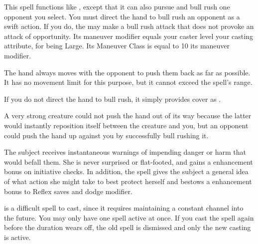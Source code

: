 \begin{spelleffect}
  This spell functions like , except that it can also pursue and bull rush one opponent you select. You must direct the hand to bull rush an opponent as a swift action. If you do, the  may make a bull rush attack that does not provoke an attack of opportunity. Its maneuver modifier equals your caster level \add your casting attribute,  for being Large. Its Maneuver Class is equal to 10 \add its maneuver modifier.
  \par The hand always moves with the opponent to push them back as far as possible. It has no movement limit for this purpose, but it cannot exceed the spell's range.
  \par If you do not direct the hand to bull rush, it simply provides cover as .
\end{spelleffect}
\begin{spellnotes}
  A very strong creature could not push the hand out of its way because the latter would instantly reposition itself between the creature and you, but an opponent could push the hand up against you by successfully bull rushing it.
\end{spellnotes}

\begin{spelleffect}
  The subject receives instantaneous warnings of impending danger or harm that would befall them. She is never surprised or flat-footed, and gains a  enhancement bonus on initiative checks. In addition, the spell gives the subject a general idea of what action she might take to best protect herself and bestows a  enhancement bonus to Reflex saves and dodge modifier.
\end{spelleffect}
\begin{spellnotes}
   is a difficult spell to cast, since it requires maintaining a constant channel into the future. You may only have one  spell active at once. If you cast the spell again before the duration wears off, the old spell is dismissed and only the new casting is active. 
\end{spellnotes}

